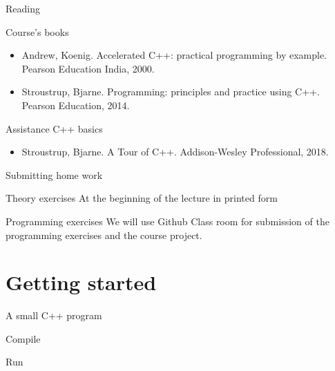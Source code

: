 \documentclass[12pt,t]{beamer}
\begin{document}
\begin{frame}{Reading}

\begin{block}{Course's books}
\begin{itemize}
\item Andrew, Koenig. Accelerated C++: practical programming by example. Pearson Education India, 2000.
\item Stroustrup, Bjarne. Programming: principles and practice using C++. Pearson Education, 2014.
\end{itemize}
\end{block}

\begin{block}{Assistance C++ basics }
\begin{itemize}
\item Stroustrup, Bjarne. A Tour of C++. Addison-Wesley Professional, 2018.
\end{itemize}
\end{block}
\end{frame}

\begin{frame}{Submitting home work}

\begin{block}{Theory exercises}
At the beginning of the lecture in printed form
\end{block}

\begin{block}{Programming exercises}
We will use Github Class room for submission of the programming exercises and the course project. 

\end{block}
\end{frame}



\section{Getting started}

\begin{frame}{A small C++ program}



\begin{block}{Compile}

\end{block}


\begin{block}{Run}

\end{block}


\end{frame}
\end{document}
